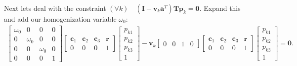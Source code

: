 \documentclass{article}
\newcommand{\mbf}[1]{\mathbf{#1}}
\begin{document}
Next lets deal with the constraint $(\forall k) \quad (\mbf{I} - \mbf{v}_k \mbf{a}^T) \mbf{T} \mbf{p}_k = \mbf{0}$. Expand this and add our homogenization variable $\omega_0$:
\begin{align}
    \begin{bmatrix} \omega_0 & 0 & 0 & 0 \\ 0 & \omega_0 & 0 & 0 \\ 0 & 0 & \omega_0 & 0 \\ 0 & 0 & 0 & 1\end{bmatrix}\begin{bmatrix} \mbf{c}_1 & \mbf{c}_2 & \mbf{c}_3 & \mbf{r} \\ 0 & 0 & 0 & 1\end{bmatrix} \begin{bmatrix} p_{k1} \\ p_{k2} \\ p_{k3} \\ 1 \end{bmatrix} - \mbf{v}_k \begin{bmatrix} 0 & 0 & 1 & 0 \end{bmatrix} \begin{bmatrix} \mbf{c}_1 & \mbf{c}_2 & \mbf{c}_3 & \mbf{r} \\ 0 & 0 & 0 & 1\end{bmatrix} \begin{bmatrix} p_{k1} \\ p_{k2} \\ p_{k3} \\ 1 \end{bmatrix} = \mbf{0}.
\end{align}
\end{document}
